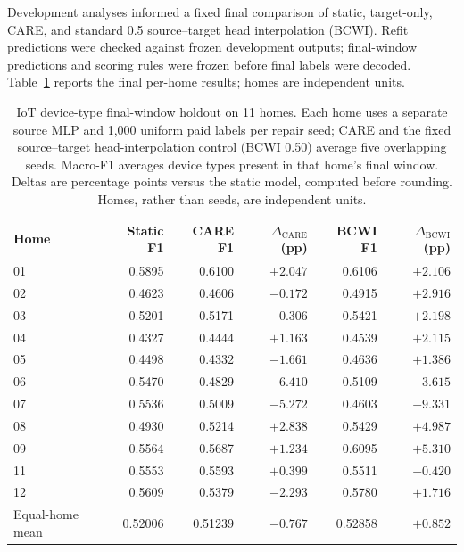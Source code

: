 \documentclass[journal]{IEEEtran}
\newcommand{\ours}{CARE}  %
\begin{document}
Development analyses informed a fixed final comparison of static, target-only, CARE, and standard 0.5 source--target head interpolation (BCWI). Refit predictions were checked against frozen development outputs; final-window predictions and scoring rules were frozen before final labels were decoded. Table~\ref{tab:iot_homes} reports the final per-home results; homes are independent units.

\begin{table}[!t]
\centering
\caption{IoT device-type final-window holdout on 11 homes. Each home uses a separate source MLP and 1{,}000 uniform paid labels per repair seed; CARE and the fixed source--target head-interpolation control (BCWI 0.50) average five overlapping seeds. Macro-F1 averages device types present in that home's final window. Deltas are percentage points versus the static model, computed before rounding. Homes, rather than seeds, are independent units.}
\label{tab:iot_homes}
\small
\setlength{\tabcolsep}{7pt}
\begin{tabular}{@{}lrrrrr@{}}
\toprule
Home & Static F1 & \ours{} F1 & $\Delta_{\mathrm{CARE}}$ (pp) & BCWI F1 & $\Delta_{\mathrm{BCWI}}$ (pp) \\
\midrule
01 & 0.5895 & 0.6100 & $+2.047$ & 0.6106 & $+2.106$ \\
02 & 0.4623 & 0.4606 & $-0.172$ & 0.4915 & $+2.916$ \\
03 & 0.5201 & 0.5171 & $-0.306$ & 0.5421 & $+2.198$ \\
04 & 0.4327 & 0.4444 & $+1.163$ & 0.4539 & $+2.115$ \\
05 & 0.4498 & 0.4332 & $-1.661$ & 0.4636 & $+1.386$ \\
06 & 0.5470 & 0.4829 & $-6.410$ & 0.5109 & $-3.615$ \\
07 & 0.5536 & 0.5009 & $-5.272$ & 0.4603 & $-9.331$ \\
08 & 0.4930 & 0.5214 & $+2.838$ & 0.5429 & $+4.987$ \\
09 & 0.5564 & 0.5687 & $+1.234$ & 0.6095 & $+5.310$ \\
11 & 0.5553 & 0.5593 & $+0.399$ & 0.5511 & $-0.420$ \\
12 & 0.5609 & 0.5379 & $-2.293$ & 0.5780 & $+1.716$ \\
\midrule
Equal-home mean & 0.52006 & 0.51239 & $-0.767$ & 0.52858 & $+0.852$ \\
\bottomrule
\end{tabular}
\end{table}
\end{document}
